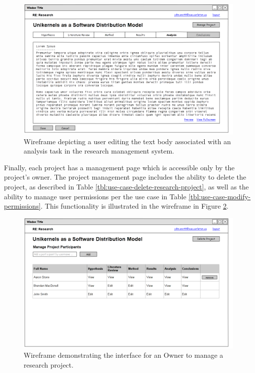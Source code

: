 \documentclass[document.tex]{subfiles}
\begin{document}
\begin{figure}[!ht]
\centering \includegraphics[width=5.5in]{./img/case-study-research-railgun/mockup-edit-analysis}
\caption{Wireframe depicting a user editing the text body associated with an analysis task in the research management system.}
\label{fig:case-research-design-edit-analysis}
\end{figure}

Finally, each project has a management page which is accessible only by the project's owner.
The project management page includes the ability to delete the project, as described in Table \ref{tbl:use-case-delete-research-project}, as well as the ability to manage user permissions per the use case in Table \ref{tbl:use-case-modify-permissions}.
This functionality is illustrated in the wireframe in Figure \ref{fig:case-research-design-manage-project}.

\begin{figure}[!ht]
\centering \includegraphics[width=5.5in]{./img/case-study-research-railgun/mockup-manage-project}
\caption{Wireframe demonstrating the interface for an Owner to manage a research project.}
\label{fig:case-research-design-manage-project}
\end{figure}
\end{document}
